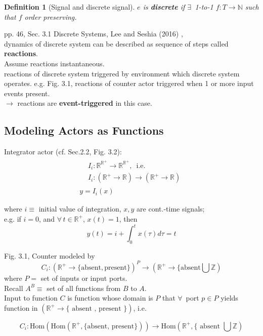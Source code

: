 \documentclass[10pt]{amsart}
\newtheorem{definition}{Definition}
\begin{document}
\begin{multicols*}{2}
\begin{definition}[Signal and discrete signal]
	$e$ is \textbf{discrete} if $\exists \,$ 1-to-1 $f:T\to \mathbb{N}$ such that $f$ order preserving.
\end{definition} 

pp. 46, Sec. 3.1 Discrete Systems, Lee and Seshia (2016) \cite{LeSe2016}, \\
dynamics of discrete system can be described as sequence of steps called \textbf{reactions}. \\
Assume reactions instantaneous. \\
reactions of discrete system triggered by environment which discrete system operates. e.g. Fig. 3.1, reactions of counter actor triggered when 1 or more input events present. \\
$\to$ reactions are \textbf{event-triggered} in this case.

\subsection{Modeling Actors as Functions}

Integrator actor (cf. Sec.2.2, Fig. 3.2):
\[
\begin{gathered}
\begin{aligned}
& I_i : \mathbb{R}^{\mathbb{R}^+} \to \mathbb{R}^{\mathbb{R}^+}, \, \text{ i.e. } \\
& I_i : (\mathbb{R}^+ \to \mathbb{R}) \to (\mathbb{R}^+ \to \mathbb{R})
\end{aligned}\\
y = I_i(x)
\end{gathered}
\]

where $i\equiv $ initial value of integration, $x,y$ are cont.-time signals; \\
e.g. if $i=0$, and $\forall \, t \in \mathbb{R}^+$, $x(t) = 1$, then 
\[
y(t) = i + \int_0^t x(\tau) d\tau = t
\]

Fig. 3.1, Counter modeled by
\[
C_i: (\mathbb{R}^+ \to \lbrace \text{absent}, \text{present} \rbrace)^P \to (\mathbb{R}^+ \to \lbrace \text{absent} \bigcup \mathbb{Z})
\]
where $P = $ set of inputs or input ports. \\

Recall $A^B \equiv$ set of all functions from $B$ to $A$. \\

Input to function $C$ is function whose domain is $P$ that $\forall \, $ port $p\in P$ yields function in $(\mathbb{R}^+ \to \lbrace \text{ absent , present } \rbrace )$, i.e.

\[
C_i: \text{Hom}( \text{Hom}(\mathbb{R}^+ , \lbrace \text{absent, present} \rbrace )) \to \text{Hom}(\mathbb{R}^+, \lbrace \text{ absent } \bigcup \mathbb{Z} )
\]


\end{multicols*}
\end{document}
